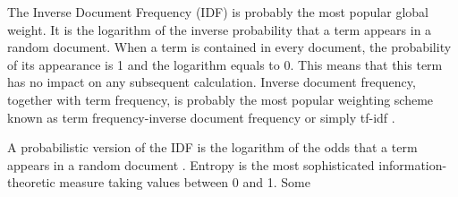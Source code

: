 The Inverse Document Frequency (IDF) \cite{ref227} is probably the most popular
global weight. It is the logarithm of the inverse probability that a term appears in
a random document. When a term is contained in every document, the probability
of its appearance is 1 and the logarithm equals to 0. This means that this term has
no impact on any subsequent calculation. Inverse document frequency, together
with term frequency, is probably the most popular weighting scheme known as
term frequency-inverse document frequency or simply tf-idf .

A probabilistic version of the IDF is the logarithm of the odds that a
term appears in a random document \cite{ref49}. Entropy is the most sophisticated
\cite{ref187} information-theoretic measure \cite{ref77} taking values between 0 and 1. Some

